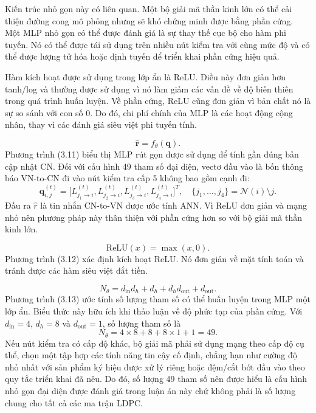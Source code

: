 Kiến trúc nhỏ gọn này có liên quan. Một bộ giải mã thần kinh lớn có thể cải thiện đường cong mô phỏng nhưng sẽ khó chứng minh được bằng phần cứng. Một MLP nhỏ gọn có thể được đánh giá là sự thay thế cục bộ cho hàm phi tuyến. Nó có thể được tái sử dụng trên nhiều nút kiểm tra với cùng mức độ và có thể được lượng tử hóa hoặc định tuyến để triển khai phần cứng hiệu quả.

Hàm kích hoạt được sử dụng trong lớp ẩn là ReLU. Điều này đơn giản hơn tanh/log và thường được sử dụng vì nó làm giảm các vấn đề về độ biến thiên trong quá trình huấn luyện. Về phần cứng, ReLU cũng đơn giản vì bản chất nó là sự so sánh với con số 0. Do đó, chi phí chính của MLP là các hoạt động cộng nhân, thay vì các đánh giá siêu việt phi tuyến tính.

\begin{equation}
\hat{\mathbf{r}}=f_{\theta}(\mathbf{q}).
\end{equation}
Phương trình (3.11) biểu thị MLP rút gọn được sử dụng để tính gần đúng bản cập nhật CN. Đối với cấu hình 49 tham số đại diện, vectơ đầu vào là bốn thông báo VN-to-CN đi vào nút kiểm tra cấp 5 không bao gồm cạnh đi:
\begin{equation*}
\mathbf{q}_{i,j}^{(t)}=
\big[L_{j_1\rightarrow i}^{(t)},L_{j_2\rightarrow i}^{(t)},L_{j_3\rightarrow i}^{(t)},L_{j_4\rightarrow i}^{(t)}\big]^T,\quad
\{j_1,\ldots,j_4\}=\mathcal{N}(i)\setminus j .
\end{equation*}
Đầu ra $\hat{r}$ là tin nhắn CN-to-VN được ước tính ANN. Vì ReLU đơn giản và mạng nhỏ nên phương pháp này thân thiện với phần cứng hơn so với bộ giải mã thần kinh lớn.

\begin{equation}
\mathrm{ReLU}(x)=\max(x,0).
\end{equation}
Phương trình (3.12) xác định kích hoạt ReLU. Nó đơn giản về mặt tính toán và tránh được các hàm siêu việt đắt tiền.

\begin{equation}
N_{\theta}=d_{\mathrm{in}}d_h+d_h+d_hd_{\mathrm{out}}+d_{\mathrm{out}}.
\end{equation}
Phương trình (3.13) ước tính số lượng tham số có thể huấn luyện trong MLP một lớp ẩn. Biểu thức này hữu ích khi thảo luận về độ phức tạp của phần cứng. Với $d_{\mathrm{in}}=4$, $d_h=8$ và $d_{\mathrm{out}}=1$, số lượng tham số là
\begin{equation*}
N_{\theta}=4\times 8+8+8\times 1+1=49.
\end{equation*}
Nếu nút kiểm tra có cấp độ khác, bộ giải mã phải sử dụng mạng theo cấp độ cụ thể, chọn một tập hợp các tính năng tin cậy cố định, chẳng hạn như cường độ nhỏ nhất với sản phẩm ký hiệu được xử lý riêng hoặc đệm/cắt bớt đầu vào theo quy tắc triển khai đã nêu. Do đó, số lượng 49 tham số nên được hiểu là cấu hình nhỏ gọn đại diện được đánh giá trong luận án này chứ không phải là số lượng chung cho tất cả các ma trận LDPC.

